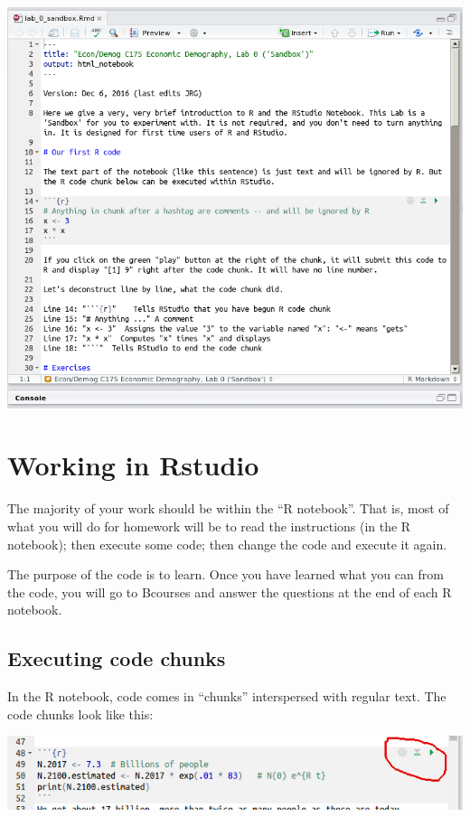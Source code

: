 \documentclass[11pt]{article}
\begin{document}
\begin{itemize}
\includegraphics[scale=.3]{RstudioRnotebook}


\end{itemize}

\section{Working in Rstudio}

The majority of your work should be within the ``R notebook''.  That is, most of what you will do for homework will be to read the instructions (in the R notebook); then execute some code; then change the code and execute it again.

The purpose of the code is to learn. Once you have learned what you can from the code, you will go to Bcourses and answer the questions at the end of each R notebook.   

\subsection{Executing code chunks}

In the R notebook, code comes in ``chunks'' interspersed with regular text.  The code chunks look like this:

\includegraphics[scale=.5]{RstudioChunk}
\end{document}
